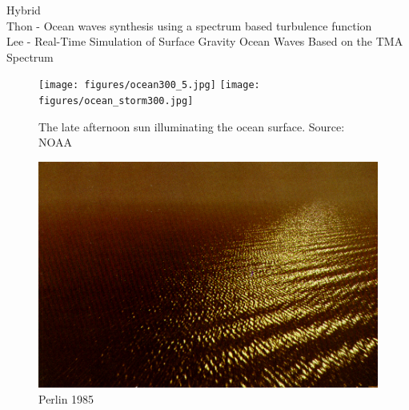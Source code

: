 Hybrid\\
Thon - Ocean waves synthesis using a spectrum based turbulence function \cite{thon:2000}\\
Lee - Real-Time Simulation of Surface Gravity Ocean Waves Based on the TMA Spectrum\cite{lee:2007}\\


\begin{figure}
\centering
 \subtop
 {
  \texttt{[image: figures/ocean300\_5.jpg]}
 }
 \hfill
 \subtop
 {
  \texttt{[image: figures/ocean\_storm300.jpg]}
 }
\caption{The late afternoon sun illuminating the ocean surface. Source: NOAA~\cite{misc:noaa}}
\end{figure}

\begin{figure}
 \centering
 \includegraphics[scale=0.25]{figures/An_Image_Synthesizer_-_Perlin_1985-021.png}
 \caption{Perlin 1985}
\end{figure}


